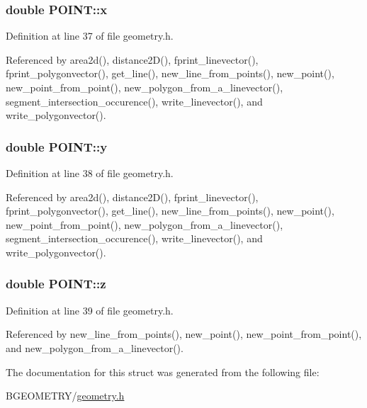 \hypertarget{struct_p_o_i_n_t_ad8ef67a3b41f849814762c55ba75267e}{
\subsubsection[{x}]{\setlength{\rightskip}{0pt plus 5cm}double P\-O\-I\-N\-T\-::x}}\label{struct_p_o_i_n_t_ad8ef67a3b41f849814762c55ba75267e}


Definition at line 37 of file geometry.\-h.



Referenced by area2d(), distance2\-D(), fprint\-\_\-linevector(), fprint\-\_\-polygonvector(), get\-\_\-line(), new\-\_\-line\-\_\-from\-\_\-points(), new\-\_\-point(), new\-\_\-point\-\_\-from\-\_\-point(), new\-\_\-polygon\-\_\-from\-\_\-a\-\_\-linevector(), segment\-\_\-intersection\-\_\-occurence(), write\-\_\-linevector(), and write\-\_\-polygonvector().

\hypertarget{struct_p_o_i_n_t_a2ce6f1bab91fb36c849051a06750e5b0}{
\subsubsection[{y}]{\setlength{\rightskip}{0pt plus 5cm}double P\-O\-I\-N\-T\-::y}}\label{struct_p_o_i_n_t_a2ce6f1bab91fb36c849051a06750e5b0}


Definition at line 38 of file geometry.\-h.



Referenced by area2d(), distance2\-D(), fprint\-\_\-linevector(), fprint\-\_\-polygonvector(), get\-\_\-line(), new\-\_\-line\-\_\-from\-\_\-points(), new\-\_\-point(), new\-\_\-point\-\_\-from\-\_\-point(), new\-\_\-polygon\-\_\-from\-\_\-a\-\_\-linevector(), segment\-\_\-intersection\-\_\-occurence(), write\-\_\-linevector(), and write\-\_\-polygonvector().

\hypertarget{struct_p_o_i_n_t_ad5800e6b529b273f398389905059fd26}{
\subsubsection[{z}]{\setlength{\rightskip}{0pt plus 5cm}double P\-O\-I\-N\-T\-::z}}\label{struct_p_o_i_n_t_ad5800e6b529b273f398389905059fd26}


Definition at line 39 of file geometry.\-h.



Referenced by new\-\_\-line\-\_\-from\-\_\-points(), new\-\_\-point(), new\-\_\-point\-\_\-from\-\_\-point(), and new\-\_\-polygon\-\_\-from\-\_\-a\-\_\-linevector().



The documentation for this struct was generated from the following file\-:\begin{DoxyCompactItemize}
\item 
B\-G\-E\-O\-M\-E\-T\-R\-Y/\hyperlink{geometry_8h}{geometry.\-h}\end{DoxyCompactItemize}
